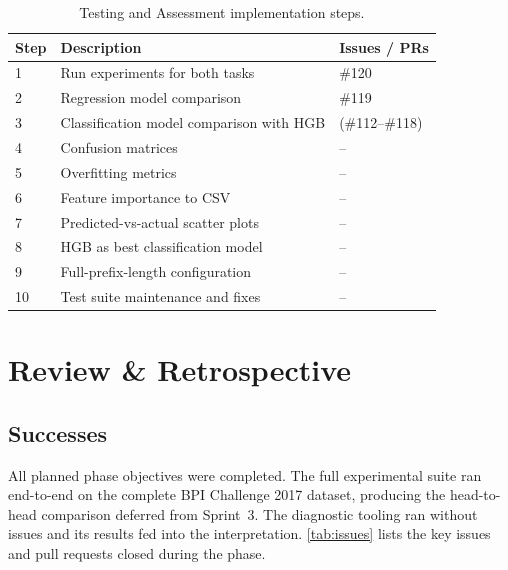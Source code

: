 \documentclass[runningheads]{llncs}
\begin{document}
\begin{table}[H]
    \centering
    \caption{Testing and Assessment implementation steps.}
    \label{tab:steps}
    \begin{tabularx}{\textwidth}{lXX}
        \toprule
        \textbf{Step} & \textbf{Description}                                   & \textbf{Issues / PRs} \\
        \midrule
        1             & Run experiments for both tasks                          & \#120                 \\
        2             & Regression model comparison                             & \#119                 \\
        3             & Classification model comparison with HGB                & (\#112--\#118)        \\
        4             & Confusion matrices                                      & --                    \\
        5             & Overfitting metrics                                     & --                    \\
        6             & Feature importance to CSV                               & --                    \\
        7             & Predicted-vs-actual scatter plots                       & --                    \\
        8             & HGB as best classification model                        & --                    \\
        9             & Full-prefix-length configuration                        & --                    \\
        10            & Test suite maintenance and fixes                        & --                    \\
        \bottomrule
    \end{tabularx}
\end{table}

\section{Review \& Retrospective}

\subsection{Successes}
All planned phase objectives were completed. The full experimental suite ran end-to-end
on the complete BPI Challenge 2017 dataset, producing the head-to-head comparison
deferred from Sprint~3. The diagnostic tooling ran without issues and its results fed
into the interpretation. \autoref{tab:issues} lists the key issues and pull
requests closed during the phase.
\end{document}
